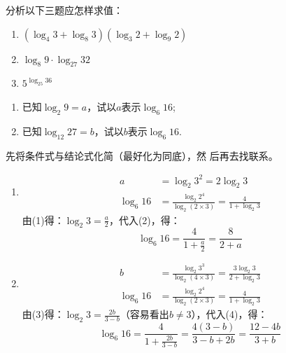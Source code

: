 \begin{blk}
    分析以下三题应怎样求值：  
\begin{enumerate}[(1)]
    \item $(\log_{4}3+\log_{8}3)(\log_{3}2+\log_{9}2)$
    \item $\log_{8}9\cdot \log_{27}32$
    \item $5^{\log_{25}36}$
\end{enumerate}  
\end{blk}

\begin{example}
\begin{enumerate}[(1)]
    \item 已知$\log_2 9=a$，试以$a$表示$\log_6 16$;
    \item 已知$\log_{12} 27=b$，试以$b$表示$\log_6 16$.
\end{enumerate}
\end{example}

\begin{analyze}
    先将条件式与结论式化简（最好化为同底），然
后再去找联系。
\end{analyze}

\begin{solution}
\begin{enumerate}[(1)]
    \item \begin{align}
        a&=\log_2 3^2 =2\log_2 3 \tag{1}\\
        \log_{6}16 &= \frac{\log_2 2^4}{\log_2(2\times 3)}=\frac{4}{1+\log_2 3}\tag{2}
    \end{align}
由(1)得：$\log_2 3=\frac{a}{2}$，代入(2)，得：
\[\log_6 16=\frac{4}{1+\frac{a}{2}}=\frac{8}{2+a}\]
\item \begin{align}
    b&=\frac{\log_2 3^3}{\log_2(4\times 3)}=\frac{3\log_2 3}{2+\log_2 3}\tag{3}\\
    \log_{6}16&=\frac{\log_2 2^4}{\log_2(2\times 3)}=\frac{4}{1+\log_2 3}\tag{4}
\end{align}
由(3)得：$\log_2 3=\frac{2b}{3-b}$（容易看出$b\ne 3$），代入(4)，得：
\[\log_6 16=\frac{4}{1+\frac{2b}{3-b}}=\frac{4(3-b)}{3-b+2b}=\frac{12-4b}{3+b}\]
\end{enumerate}
\end{solution}

